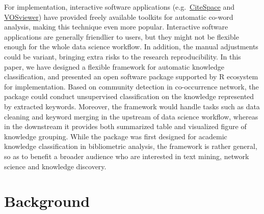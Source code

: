 For implementation, interactive software applications
(e.g.~\href{http://cluster.cis.drexel.edu/~cchen/citespace/}{CiteSpace}
and \href{https://www.vosviewer.com/}{VOSviewer}) have provided freely
available toolkits for automatic co-word analysis, making this technique
even more popular. Interactive software applications are generally
friendlier to users, but they might not be flexible enough for the whole
data science workflow. In addition, the manual adjustments could be
variant, bringing extra risks to the research reproducibility. In this
paper, we have designed a flexible framework for automatic knowledge
classification, and presented an open software package 
supported by R ecosystem for implementation. Based on community
detection in co-occurrence network, the package could conduct
unsupervised classification on the knowledge represented by extracted
keywords. Moreover, the framework would handle tasks such as data
cleaning and keyword merging in the upstream of data science workflow,
whereas in the downstream it provides both summarized table and
visualized figure of knowledge grouping. While the package was first
designed for academic knowledge classification in bibliometric analysis,
the framework is rather general, so as to benefit a broader audience who
are interested in text mining, network science and knowledge discovery.

\hypertarget{background}{%
\section{Background}\label{background}}

